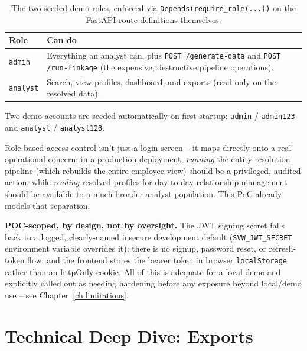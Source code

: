 \documentclass[11pt]{report}
\newcommand{\code}[1]{\lstinline[style=plain]!#1!}
\begin{document}
\begin{table}[h]
\centering
\small
\begin{tabular}{@{}lp{9.5cm}@{}}
\toprule
\textbf{Role} & \textbf{Can do} \\
\midrule
\texttt{admin} & Everything an analyst can, plus \texttt{POST /generate-data} and \texttt{POST /run-linkage} (the expensive, destructive pipeline operations). \\
\texttt{analyst} & Search, view profiles, dashboard, and exports (read-only on the resolved data). \\
\bottomrule
\end{tabular}
\caption{The two seeded demo roles, enforced via \texttt{Depends(require\_role(...))} on the FastAPI route definitions themselves.}
\end{table}

Two demo accounts are seeded automatically on first startup: \texttt{admin} / \texttt{admin123} and \texttt{analyst} / \texttt{analyst123}.

\begin{bizbox}
Role-based access control isn't just a login screen -- it maps directly onto a real operational concern: in a production deployment, \emph{running} the entity-resolution pipeline (which rebuilds the entire employee view) should be a privileged, audited action, while \emph{reading} resolved profiles for day-to-day relationship management should be available to a much broader analyst population. This PoC already models that separation.
\end{bizbox}

\begin{engbox}
\textbf{POC-scoped, by design, not by oversight.} The JWT signing secret falls back to a logged, clearly-named insecure development default (\code{SVW_JWT_SECRET} environment variable overrides it); there is no signup, password reset, or refresh-token flow; and the frontend stores the bearer token in browser \code{localStorage} rather than an httpOnly cookie. All of this is adequate for a local demo and explicitly called out as needing hardening before any exposure beyond local/demo use -- see Chapter~\ref{ch:limitations}.
\end{engbox}

\chapter{Technical Deep Dive: Exports}
\label{ch:exports}
\end{document}
